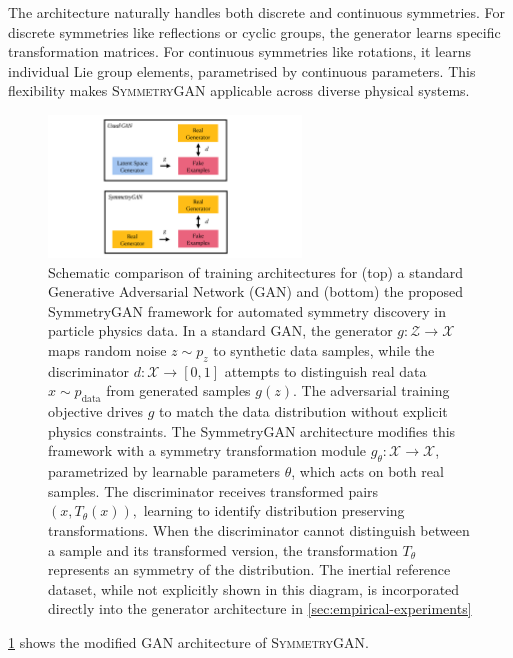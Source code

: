     The architecture naturally handles both discrete and continuous symmetries.
    For discrete symmetries like reflections or cyclic groups, the generator learns specific transformation matrices.
    For continuous symmetries like rotations, it learns individual Lie group elements, parametrised by continuous parameters.
    This flexibility makes \textsc{SymmetryGAN} applicable across diverse physical systems.
\begin{figure}
    \centering
    \includegraphics[width=0.6\textwidth]{figures/chapter-09/SchematicSymmetry2.pdf}
    \caption[Architectural comparison of standard GAN and SymmetryGAN for automated symmetry discovery.]{Schematic comparison of training architectures for (top) a standard Generative Adversarial Network (GAN) and (bottom) the proposed SymmetryGAN framework for automated symmetry discovery in particle physics data.
    In a standard GAN, the generator $g: \mathcal{Z} \to \mathcal{X}$ maps random noise $z \sim p_z$ to synthetic data samples, while the discriminator $d: \mathcal{X} \to [0,1]$ attempts to distinguish real data $x \sim p_{\text{data}}$ from generated samples $g(z)$. The adversarial training objective drives $g$ to match the data distribution without explicit physics constraints.
    The SymmetryGAN architecture modifies this framework with a symmetry transformation module $g_\theta: \mathcal{X} \to \mathcal{X}$, parametrized by learnable parameters $\theta$, which acts on both real samples. The discriminator receives transformed pairs $(x, T_\theta(x)),$ learning to identify distribution preserving transformations. When the discriminator cannot distinguish between a sample and its transformed version, the transformation $T_\theta$ represents an symmetry of the distribution.
    The inertial reference dataset, while not explicitly shown in this diagram, is incorporated directly into the generator architecture in \cref{sec:empirical-experiments}}
    \label{fig:schematic}
\end{figure}
    \cref{fig:schematic} shows the modified GAN architecture of \textsc{SymmetryGAN}.
    
